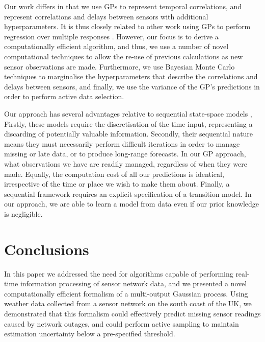 \documentclass{acmtrans2m}
\begin{document}
Our work differs in that we use GPs to represent temporal correlations, and represent correlations and delays between sensors with additional hyperparameters. It is thus closely related to other work using GPs to perform regression over multiple responses \cite{dep_GP,latent_factor}. However, our focus is to derive a computationally efficient algorithm, and thus, we use a number of novel computational techniques to allow the re-use of previous calculations as new sensor observations are made. Furthermore, we use Bayesian Monte Carlo techniques to marginalise the hyperparameters that describe the correlations and delays between sensors, and finally, we use the variance of the GP's predictions in order to perform active data selection.

Our approach has several advantages relative to sequential state-space models \cite{Girard,Jazwinski}, Firstly, these models require the discretisation of the time input, representing a discarding of potentially valuable information. Secondly, their sequential nature means they must necessarily perform difficult iterations in order to manage missing or late data, or to produce long-range forecasts. In our GP approach, what observations we have are readily managed, regardless of when they were made. Equally, the computation cost of all our predictions is identical, irrespective of the time or place we wish to make them about. Finally, a sequential framework requires an explicit specification of a transition model. In our approach, we are able to learn a model from data even if our prior knowledge is negligible.


\section{Conclusions}\label{sec_conclusion}

\noindent In this paper we addressed the need for algorithms capable of performing real-time information processing of sensor network data, and we presented a novel computationally efficient formalism of a multi-output Gaussian process. Using weather data collected from a sensor network on the south coast of the UK, we demonstrated that this formalism could effectively predict missing sensor readings caused by network outages, and could perform active sampling to maintain estimation uncertainty below a pre-specified threshold.
\end{document}
